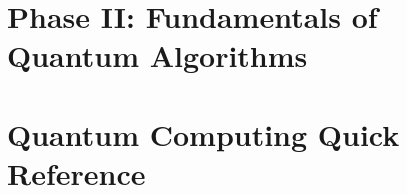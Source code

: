 \documentclass{report}
\begin{document}



\chapter{Phase II: Fundamentals of Quantum Algorithms}













\chapter{Quantum Computing Quick Reference}




\begin{appendices}\label{sec:Appendix}
  \printindex
\end{appendices}

\end{document}
